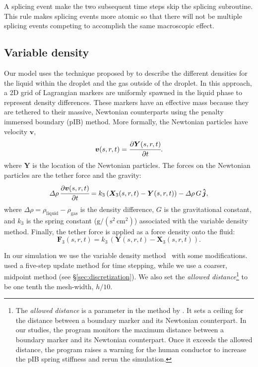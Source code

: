 \documentclass{jfm}
\newcommand{\charles}[1]{\todo[inline,color=blue!40]{Charles: #1}}
\begin{document}
A splicing event make the two subsequent time steps skip the splicing subroutine. This rule makes splicing events more atomic so that there will not be multiple splicing events competing to accomplish the same macroscopic effect. 

\subsection{Variable density}
Our model uses the technique proposed by \citet{kim2008numerical} to describe the different densities for the liquid within the droplet and the gas outside of the droplet. In this approach, a 2D grid of Lagrangian markers are uniformly spawned in the liquid phase to represent density differences. These markers have an effective mass because they are tethered to their massive, Newtonian counterparts using the penalty immersed boundary (pIB) method. More formally, the Newtonian particles have velocity $\boldsymbol{v}$, 
\begin{equation}
\bm{v}(s,r,t) = \cfrac{\partial \bm{Y}(s,r,t)}{\partial t}.
\end{equation}
where $\boldsymbol{Y}$ is the location of the Newtonian particles. 
The forces on the Newtonian particles are the tether force and the gravity: 
\begin{equation}
\varDelta \rho \, \cfrac{\partial \bm{v}(s,r,t)}{\partial t} = k_3 \, (
    \bm{X}_3(s,r,t) - \bm{Y}(s,r,t)
) - \varDelta \rho \, G \, \bm{\hat{j}},
\end{equation}
where $\Delta \rho = \rho_\text{liquid} - \rho_\text{gas}$ is the density difference, $G$ is the gravitational constant, and $k_3$ is the spring constant ($\text{g}/(\text{s}^2\,\text{cm}^2)$) associated with the variable density method. Finally, the tether force is applied as a force density onto the fluid:
\begin{equation}
\bm{F}_3(s,r,t) = k_3 \, (
    \bm{Y}(s,r,t) - \bm{X}_3(s,r,t)
). 
\end{equation}

In our simulation we use the variable density method~\citep{kim2008numerical} with some modifications. \citet{kim2008numerical} used a five-step update method for time stepping, while we use a coarser, midpoint method (see \S\ref{sec:discretization}). We also set the \textit{allowed distance}\footnote{The \textit{allowed distance} is a parameter in the method by \citet{kim2008numerical}. It sets a ceiling for the distance between a boundary marker and its Newtonian counterpart. In our studies, the program monitors the maximum distance between a boundary marker and its Newtonian counterpart. Once it exceeds the allowed distance, the program raises a warning for the human conductor to increase the pIB spring stiffness and rerun the simulation.} to be one tenth the mesh-width, $h/10$. 
\end{document}
